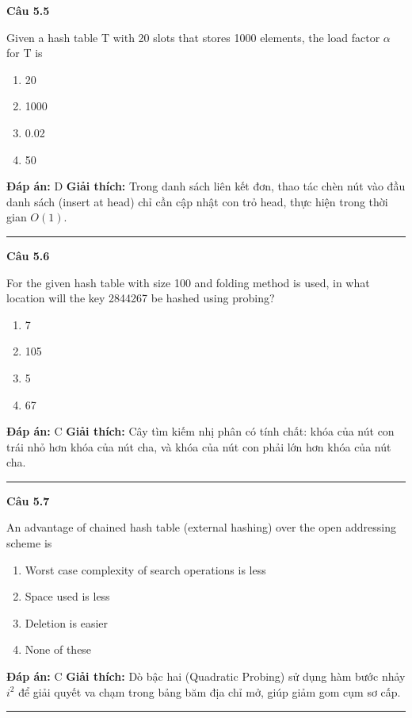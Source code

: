 \documentclass[11pt,a4paper]{article}
\newenvironment{question}[1]{%
  \par\vspace{1em}\noindent\textbf{\large Câu #1}\par\vspace{0.4em}
}{%
  \par\vspace{1em}\hrule\vspace{0.6em}
}
\newenvironment{choices}{%
  \begin{enumerate}[label=\textbf{\Alph*.},leftmargin=2.2em,itemsep=2pt,topsep=3pt]
}{%
  \end{enumerate}
}
\newcommand{\choice}{\item}
\begin{document}
\begin{question}{5.5}
Given a hash table T with 20 slots that stores 1000 elements, the load factor \(\alpha\) for T is
\begin{choices}
\choice 20
\choice 1000
\choice 0.02
\choice 50
\end{choices}
\textbf{Đáp án:} D
\textbf{Giải thích:} Trong danh sách liên kết đơn, thao tác chèn nút vào đầu danh sách (insert at head) chỉ cần cập nhật con trỏ head, thực hiện trong thời gian \(O(1)\).
\end{question}

\begin{question}{5.6}
For the given hash table with size 100 and folding method is used, in what location will the key 2844267 be hashed using probing?
\begin{choices}
\choice 7
\choice 105
\choice 5
\choice 67
\end{choices}
\textbf{Đáp án:} C
\textbf{Giải thích:} Cây tìm kiếm nhị phân có tính chất: khóa của nút con trái nhỏ hơn khóa của nút cha, và khóa của nút con phải lớn hơn khóa của nút cha.
\end{question}

\begin{question}{5.7}
An advantage of chained hash table (external hashing) over the open addressing scheme is
\begin{choices}
\choice Worst case complexity of search operations is less
\choice Space used is less
\choice Deletion is easier
\choice None of these
\end{choices}
\textbf{Đáp án:} C
\textbf{Giải thích:} Dò bậc hai (Quadratic Probing) sử dụng hàm bước nhảy \(i^2\) để giải quyết va chạm trong bảng băm địa chỉ mở, giúp giảm gom cụm sơ cấp.
\end{question}
\end{document}

